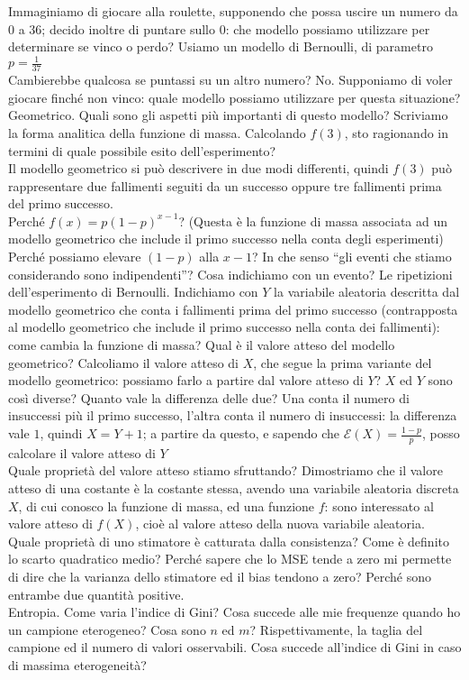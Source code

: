 \documentclass{article}
\begin{document}
    Immaginiamo di giocare alla roulette, supponendo che possa uscire un numero da $ 0 $ a $ 36 $; decido inoltre di puntare sullo $ 0 $: che modello possiamo utilizzare per
    determinare se vinco o perdo? Usiamo un modello di Bernoulli, di parametro $ p = \frac{ 1 }{ 37 } $ \\
    Cambierebbe qualcosa se puntassi su un altro numero? No. Supponiamo di voler giocare finché non vinco: quale modello possiamo utilizzare per questa situazione? Geometrico.
    Quali sono gli aspetti più importanti di questo modello? Scriviamo la forma analitica della funzione di massa. Calcolando $ f ( 3 ) $, sto ragionando in termini di quale
    possibile esito dell'esperimento? \\
    Il modello geometrico si può descrivere in due modi differenti, quindi $ f ( 3 ) $ può rappresentare due fallimenti seguiti da un successo oppure tre fallimenti prima del
    primo successo. \\
    Perché $ f(x) = p (1 - p)^{x - 1} $? (Questa è la funzione di massa associata ad un modello geometrico che include il primo successo nella conta degli esperimenti) Perché
    possiamo elevare $ (1 - p) $ alla $ x - 1 $? In che senso “gli eventi che stiamo considerando sono indipendenti”? Cosa indichiamo con un evento? Le ripetizioni
    dell'esperimento di Bernoulli. Indichiamo con $ Y $ la variabile aleatoria descritta dal modello geometrico che conta i fallimenti prima del primo successo (contrapposta al
    modello geometrico che include il primo successo nella conta dei fallimenti): come cambia la funzione di massa? Qual è il valore atteso del modello geometrico? Calcoliamo il
    valore atteso di $ X $, che segue la prima variante del modello geometrico: possiamo farlo a partire dal valore atteso di $ Y $? $ X $ ed $ Y $ sono così diverse? Quanto vale
    la differenza delle due? Una conta il numero di insuccessi più il primo successo, l'altra conta il numero di insuccessi: la differenza vale $ 1 $, quindi $ X = Y + 1 $; a
    partire da questo, e sapendo che $ \mathcal E ( X ) = \frac{ 1 - p }{ p } $, posso calcolare il valore atteso di $ Y $ \\
    Quale proprietà del valore atteso stiamo sfruttando? Dimostriamo che il valore atteso di una costante è la costante stessa, avendo una variabile aleatoria discreta $ X $, di
    cui conosco la funzione di massa, ed una funzione $ f $: sono interessato al valore atteso di $ f ( X ) $, cioè al valore atteso della nuova variabile aleatoria. \\
    Quale proprietà di uno stimatore è catturata dalla consistenza? Come è definito lo scarto quadratico medio? Perché sapere che lo MSE tende a zero mi permette di dire che la
    varianza dello stimatore ed il bias tendono a zero? Perché sono entrambe due quantità positive. \\
    Entropia. Come varia l'indice di Gini? Cosa succede alle mie frequenze quando ho un campione eterogeneo? Cosa sono $ n $ ed $ m $? Rispettivamente, la taglia del campione ed
    il numero di valori osservabili. Cosa succede all'indice di Gini in caso di massima eterogeneità? \\
    
\end{document}

